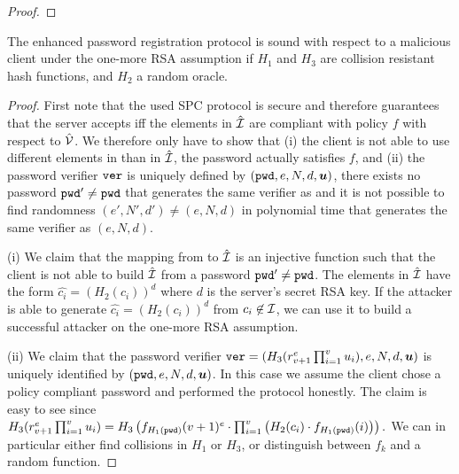 \begin{proof}
\end{proof}

\begin{lemma}[Soundness]\label{lem:soundness}
 The enhanced password registration protocol is sound with respect to a malicious client under the one-more RSA assumption if $H_1$ and $H_3$ are collision resistant hash functions, and $H_2$ a random oracle.
\end{lemma}

\begin{proof}
  First note that the used \ac{SPC} protocol is secure and therefore guarantees that the server accepts iff the elements in $\hat{\mathcal{I}}$ are compliant with policy $f$ with respect to $\hat{\mathcal{V}}$.
  We therefore only have to show that (i) the client is not able to use different elements in \ClientSet than in $\hat{\mathcal{I}}$, \ie the password \pwd actually satisfies $f$, and (ii) the password verifier $\mathtt{ver}$ is uniquely defined by $(\mathtt{pwd}, e, N, d, \bm{u})$, \ie there exists no password $\mathtt{pwd}'\not=\mathtt{pwd}$ that generates the same verifier as \pwd and it is not possible to find randomness $(e',N', d')\not=(e, N, d)$ in polynomial time that generates the same verifier as $(e,N, d)$.
  
  (i) We claim that the mapping from \ClientSet to $\hat{\mathcal{I}}$ is an injective function such that the client is not able to build $\hat{\mathcal{I}}$ from a password $\mathtt{pwd}'\not=\mathtt{pwd}$.
  The elements in $\hat{\mathcal{I}}$ have the form $\hat{c_i}=(H_2(c_i))^d$ where $d$ is the server's secret RSA key.
  If the attacker is able to generate $\hat{c_i}=(H_2(c_i))^d$ from $c_i\not\in\mathcal{I}$, we can use it to build a successful attacker on the one-more RSA assumption.
  
  (ii) We claim that the password verifier $\mathtt{ver}=(H_3(r_{v+1}^e\prod_{i=1}^{v} u_i), e, N, d, \bm{u})$ is uniquely identified by $(\mathtt{pwd}, e, N, d, \bm{u})$.
  In this case we assume the client chose a policy compliant password \pwd and performed the protocol honestly.
  The claim is easy to see since 
  $
    H_3(r_{v+1}^e\prod_{i=1}^{v} u_i) = 
    H_3\left(f_{H_1(\mathtt{pwd})}(v+1)^e \cdot \prod_{i=1}^{v} \left(H_2(c_i)\cdot f_{H_1(\mathtt{pwd})}(i)\right)\right).
  $
  We can in particular either find collisions in $H_1$ or $H_3$, or distinguish between $f_k$ and a random function.
\end{proof}

